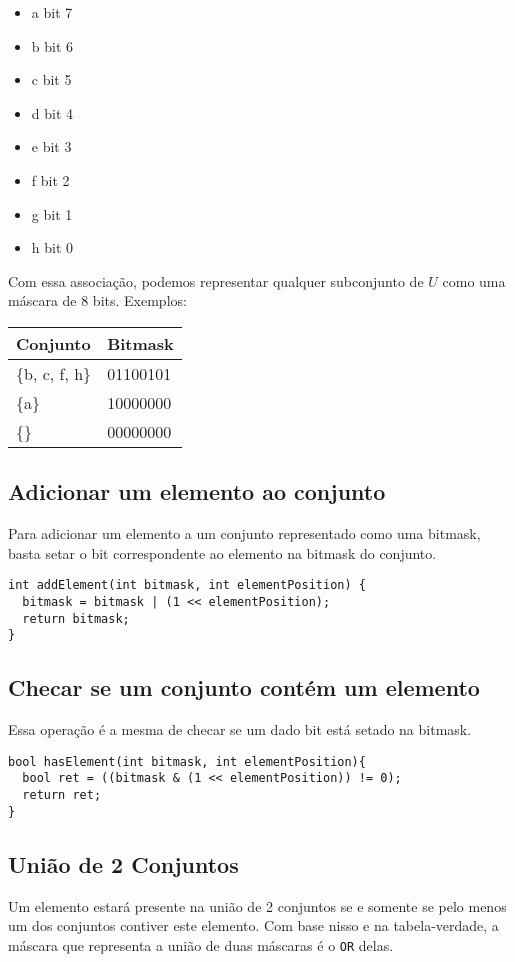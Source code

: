 \documentclass{article}
\begin{document}
\begin{itemize}
    \item a \rightarrow bit 7
    \item b \rightarrow bit 6
    \item c \rightarrow bit 5
    \item d \rightarrow bit 4
    \item e \rightarrow bit 3
    \item f \rightarrow bit 2
    \item g \rightarrow bit 1
    \item h \rightarrow bit 0
\end{itemize}

Com essa associação, podemos representar qualquer subconjunto de \(U\) como uma máscara de 8 bits. Exemplos:

\begin{tabular}{|l|l|}
\hline
Conjunto & Bitmask \\
\hline
\{b, c, f, h\} & 01100101 \\
\{a\} & 10000000 \\
\{\} & 00000000 \\
\hline
\end{tabular}

\subsection{Adicionar um elemento ao conjunto}
Para adicionar um elemento a um conjunto representado como uma bitmask, basta setar o bit correspondente ao elemento na bitmask do conjunto.

\begin{verbatim}
int addElement(int bitmask, int elementPosition) {
  bitmask = bitmask | (1 << elementPosition);
  return bitmask;
}
\end{verbatim}

\subsection{Checar se um conjunto contém um elemento}
Essa operação é a mesma de checar se um dado bit está setado na bitmask.

\begin{verbatim}
bool hasElement(int bitmask, int elementPosition){
  bool ret = ((bitmask & (1 << elementPosition)) != 0);
  return ret;
}
\end{verbatim}

\subsection{União de 2 Conjuntos}
Um elemento estará presente na união de 2 conjuntos se e somente se pelo menos um dos conjuntos contiver este elemento. Com base nisso e na tabela-verdade, a máscara que representa a união de duas máscaras é o \texttt{OR} delas.
\end{document}
